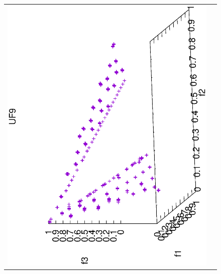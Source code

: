 \begin{figure}[H]
\begin{tabular}{cc}
 \includegraphics[scale=0.3, angle=-90,origin=c]{Figures_Chapter7/Results_Chapter4/Summary_Representative/VSD-MOEA-D/UF9.eps} \\

\end{tabular}
\end{figure}
